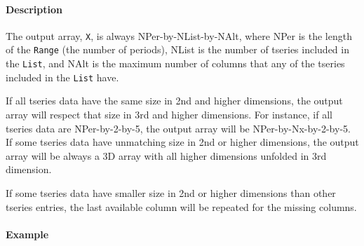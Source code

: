 \paragraph{Description}

The output array, \texttt{X}, is always NPer-by-NList-by-NAlt, where
NPer is the length of the \texttt{Range} (the number of periods), NList
is the number of tseries included in the \texttt{List}, and NAlt is the
maximum number of columns that any of the tseries included in the
\texttt{List} have.

If all tseries data have the same size in 2nd and higher dimensions, the
output array will respect that size in 3rd and higher dimensions. For
instance, if all tseries data are NPer-by-2-by-5, the output array will
be NPer-by-Nx-by-2-by-5. If some tseries data have unmatching size in
2nd or higher dimensions, the output array will be always a 3D array
with all higher dimensions unfolded in 3rd dimension.

If some tseries data have smaller size in 2nd or higher dimensions than
other tseries entries, the last available column will be repeated for
the missing columns.

\paragraph{Example}


